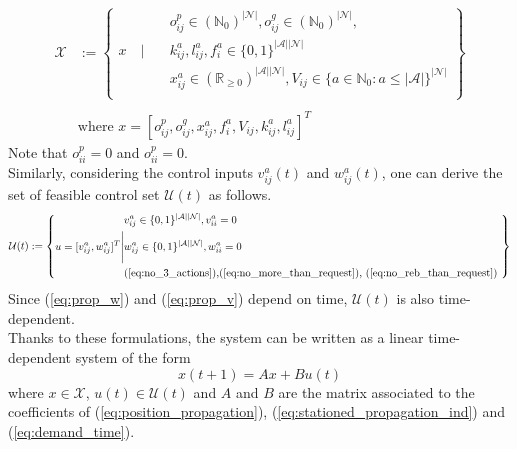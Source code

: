 \begin{equation}
	\begin{aligned}
	\mathcal{X} &:= \left\{
	\begin{aligned}
		&  o^p_{ij} \in (\mathbb{N}_0)^{|\mathcal{N}|}, o^g_{ij} \in (\mathbb{N}_0)^{|\mathcal{N}|},  \\
		 x \quad  \Bigg| \quad&k^a_{ij}, l^a_{ij},f^a_{i} \in \{0,1\}^{|\mathcal{A}||\mathcal{N}|} \\%
		&  x_{ij}^a\in (\mathbb{R}_{\ge 0})^{|\mathcal{A}||\mathcal{N}|}, V_{ij} \in \{ a \in \mathbb{N}_0 : a \leq |\mathcal{A}| \}^{|\mathcal{N}|}\\%
	\end{aligned}
	\right\}\\
	&\\
	&\text{where }  x = [o^p_{ij},o^g_{ij}, x_{ij}^a, f^a_{i}, V_{ij} , k^a_{ij}, l^a_{ij}]^T
\end{aligned}
\end{equation}
Note that $o^p_{ii} = 0$ and $o^p_{ii} = 0$. \\
Similarly, considering the control inputs $v^{a}_{ij}(t)$ and $w^{a}_{ij}(t)$, one can derive the set of feasible control set $\mathcal{U}(t)$ as follows. 
\begin{equation}
	\mathcal{\mathcal{U}}(t) := \left\{
	\begin{aligned}
		&v^a_{ij} \in \{0,1\}^{|\mathcal{A}||\mathcal{N}|}, v^a_{ii} = 0 \\
		u = [v^{a}_{ij}, w^{a}_{ij}]^T \Bigg|&w^a_{ij} \in \{0,1\}^{|\mathcal{A}||\mathcal{N}|},w^a_{ii} = 0 \\ 
		& \text{(\ref{eq:no_3_actions}),\text{(\ref{eq:no_more_than_request})}, \text{(\ref{eq:no_reb_than_request})}
		} \\
	\end{aligned}
	\right\}
\end{equation}
Since (\ref{eq:prop_w}) and (\ref{eq:prop_v}) depend on time, $\mathcal{U}(t)$ is also time-dependent. \\
Thanks to these formulations, the system can be written as a linear time-dependent system of the form
\begin{equation}
	x(t+1) = Ax + Bu(t)\label{eq:normal_system}
\end{equation}
where $x \in \mathcal{X}$, $u(t) \in \mathcal{U}(t)$ and $A$ and $B$ are the matrix associated to the coefficients of (\ref{eq:position_propagation}), (\ref{eq:stationed_propagation_ind}) and (\ref{eq:demand_time}). \\
